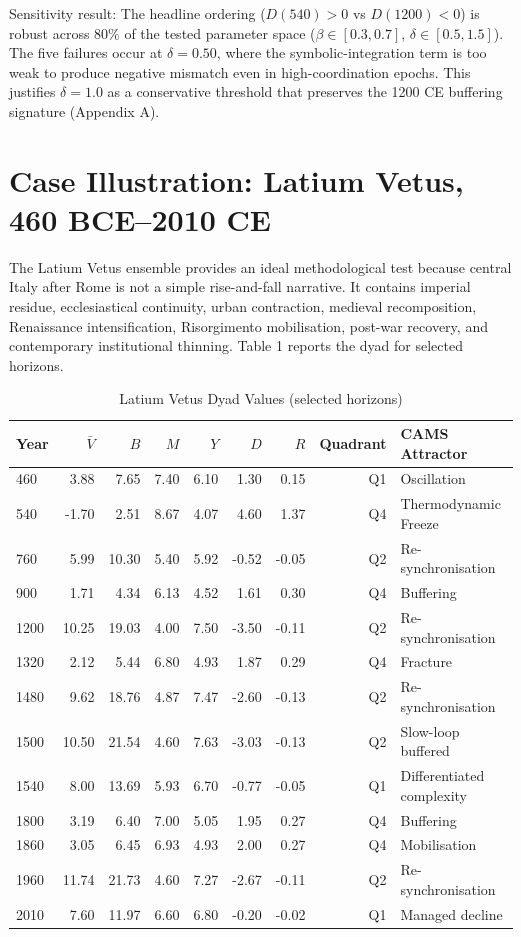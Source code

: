 \documentclass[11pt,a4paper]{article}
\begin{document}
Sensitivity result: The headline ordering (\(D(540)>0\) vs \(D(1200)<0\)) is robust across 80\% of the tested parameter space (\(\beta\in[0.3,0.7]\), \(\delta\in[0.5,1.5]\)). The five failures occur at \(\delta=0.50\), where the symbolic-integration term is too weak to produce negative mismatch even in high-coordination epochs. This justifies \(\delta=1.0\) as a conservative threshold that preserves the 1200 CE buffering signature (Appendix A).

\section{Case Illustration: Latium Vetus, 460 BCE--2010 CE}
The Latium Vetus ensemble provides an ideal methodological test because central Italy after Rome is not a simple rise-and-fall narrative. It contains imperial residue, ecclesiastical continuity, urban contraction, medieval recomposition, Renaissance intensification, Risorgimento mobilisation, post-war recovery, and contemporary institutional thinning. Table 1 reports the dyad for selected horizons.

\begin{table}[htbp]
\centering
\caption{Latium Vetus Dyad Values (selected horizons)}
\begin{tabular}{lrrrrrrrl}
\toprule
Year & \(\bar{V}\) & \(B\) & \(M\) & \(Y\) & \(D\) & \(R\) & Quadrant & CAMS Attractor \\
\midrule
460 & 3.88 & 7.65 & 7.40 & 6.10 & 1.30 & 0.15 & Q1 & Oscillation \\
540 & -1.70 & 2.51 & 8.67 & 4.07 & 4.60 & 1.37 & Q4 & Thermodynamic Freeze \\
760 & 5.99 & 10.30 & 5.40 & 5.92 & -0.52 & -0.05 & Q2 & Re-synchronisation \\
900 & 1.71 & 4.34 & 6.13 & 4.52 & 1.61 & 0.30 & Q4 & Buffering \\
1200 & 10.25 & 19.03 & 4.00 & 7.50 & -3.50 & -0.11 & Q2 & Re-synchronisation \\
1320 & 2.12 & 5.44 & 6.80 & 4.93 & 1.87 & 0.29 & Q4 & Fracture \\
1480 & 9.62 & 18.76 & 4.87 & 7.47 & -2.60 & -0.13 & Q2 & Re-synchronisation \\
1500 & 10.50 & 21.54 & 4.60 & 7.63 & -3.03 & -0.13 & Q2 & Slow-loop buffered \\
1540 & 8.00 & 13.69 & 5.93 & 6.70 & -0.77 & -0.05 & Q1 & Differentiated complexity \\
1800 & 3.19 & 6.40 & 7.00 & 5.05 & 1.95 & 0.27 & Q4 & Buffering \\
1860 & 3.05 & 6.45 & 6.93 & 4.93 & 2.00 & 0.27 & Q4 & Mobilisation \\
1960 & 11.74 & 21.73 & 4.60 & 7.27 & -2.67 & -0.11 & Q2 & Re-synchronisation \\
2010 & 7.60 & 11.97 & 6.60 & 6.80 & -0.20 & -0.02 & Q1 & Managed decline \\
\bottomrule
\end{tabular}
\end{table}
\end{document}
